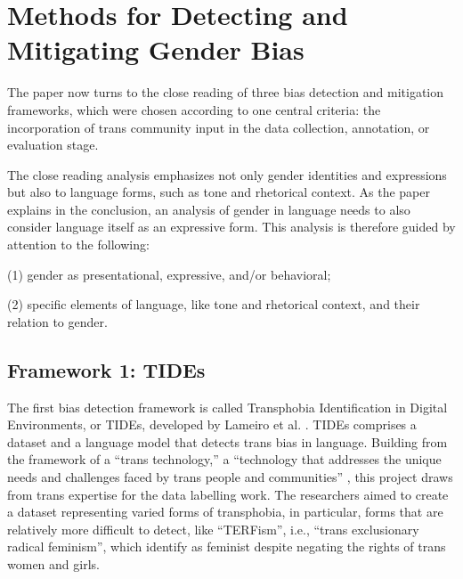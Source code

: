 \documentclass[anonymous,review]{acmart}
\begin{document}
\section{Methods for Detecting and Mitigating Gender Bias}
The paper now turns to the close reading of three bias detection and mitigation frameworks, which were chosen according to one central criteria: the incorporation of trans community input in the data collection, annotation, or evaluation stage. 

The close reading analysis emphasizes not only gender identities and expressions but also to language forms, such as tone and rhetorical context. As the paper explains in the conclusion, an analysis of gender in language needs to also consider language itself as an expressive form. This analysis is therefore guided by attention to the following: 

(1) gender as presentational, expressive, and/or behavioral; 

(2) specific elements of language, like tone and rhetorical context, and their relation to gender. 

\subsection{Framework 1: TIDEs}
The first bias detection framework is called Transphobia Identification in Digital Environments, or TIDEs, developed by Lameiro et al. \citep{lameiro:2025}. TIDEs comprises a dataset and a language model that detects trans bias in language. Building from the framework of a “trans technology,” a “technology that addresses the unique needs and challenges faced by trans people and communities” \citep{haimson:2025}, this project draws from trans expertise for the data labelling work. The researchers aimed to create a dataset representing varied forms of transphobia, in particular, forms that are relatively more difficult to detect, like “TERFism”, i.e., “trans exclusionary radical feminism”, which identify as feminist despite negating the rights of trans women and girls. 
\end{document}
